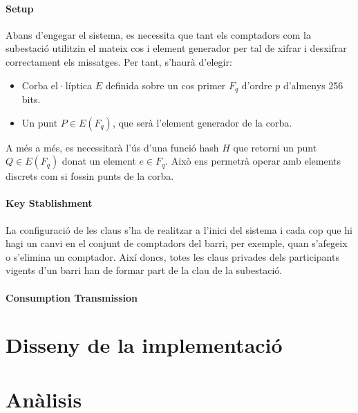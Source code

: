 \documentclass{article}
\begin{document}
\subsection{Setup}
Abans d'engegar el sistema, es necessita que tant els comptadors com la subestació utilitzin el mateix cos i element generador per tal de xifrar i desxifrar correctament els missatges. Per tant, s'haurà d'elegir:
\begin{itemize}
	\item Corba el·líptica $E$ definida sobre un cos primer $F_q$ d'ordre $p$ d'almenys 256 bits.
	\item Un punt $P \in E(F_q)$, que serà l'element generador de la corba.
\end{itemize}
A més a més, es necessitarà l'ús d'una funció hash %
$H$ que retorni un punt $Q \in E(F_q)$ donat un element $e \in F_q$. Això ens permetrà operar amb elements discrets com si fossin punts de la corba. 
\subsection{Key Stablishment}\label{section:ks}
La configuració de les claus s'ha de realitzar a l'inici del sistema i cada cop que hi hagi un canvi en el conjunt de comptadors del barri, per exemple, quan s'afegeix o s'elimina un comptador. Així doncs, totes les claus privades dels participants vigents d'un barri han de formar part de la clau de la subestació. 
\subsection{Consumption Transmission}\label{section:ct}
\part{Disseny de la implementació}\label{part:disseny}

\part{Anàlisis}\label{part:analisis}
\end{document}
